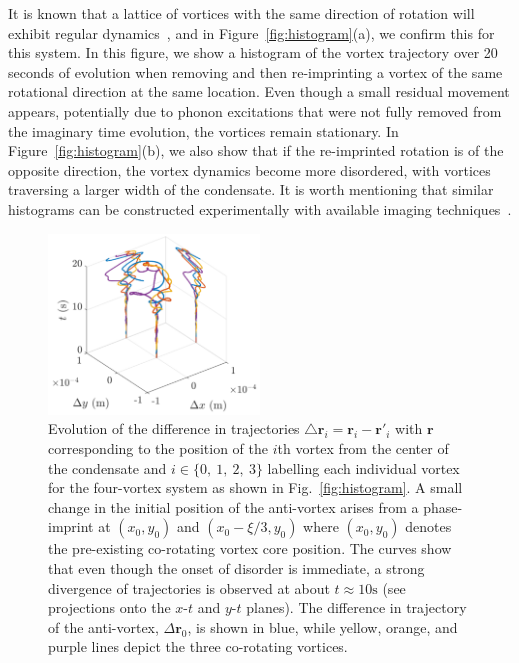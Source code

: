It is known that a lattice of vortices with the same direction of rotation will exhibit regular dynamics~\cite{abo2001}, and in Figure~\ref{fig:histogram}(a), we confirm this for this system.
In this figure, we show a histogram of the vortex trajectory over 20 seconds of evolution when removing and then re-imprinting a vortex of the same rotational direction at the same location.
Even though a small residual movement appears, potentially due to phonon excitations that were not fully removed from the imaginary time evolution, the vortices remain stationary.
In Figure~\ref{fig:histogram}(b), we also show that if the re-imprinted rotation is of the opposite direction, the vortex dynamics become more disordered, with vortices traversing a larger width of the condensate.
It is worth mentioning that similar histograms can be constructed experimentally with available imaging techniques~\cite{wilson2015,freilich2010}.

\begin{figure}
\center \includegraphics[width=0.5\textwidth]{data/2d/evolution/evolution}

\caption{
Evolution of the difference in trajectories $\triangle \textbf{r}_i = \textbf{r}_{i}-\textbf{r}'_{i}$ with $\textbf{r}$ corresponding to the position of the $i$th vortex from the center of the condensate and $i\in \{0,\ 1,\ 2,\ 3\}$ labelling each individual vortex for the four-vortex system as shown in Fig.~\ref{fig:histogram}.
A small change in the initial position of the anti-vortex arises from a phase-imprint at $(x_{0},y_{0})$ and $(x_{0}-\xi/3,y_{0})$ where $(x_{0},y_{0})$ denotes the pre-existing co-rotating vortex core position.
The curves show that even though the onset of disorder is immediate, a strong divergence of trajectories is observed at about $t\approx 10 \text{s}$ (see projections onto the $x$-$t$ and $y$-$t$ planes).
The difference in trajectory of the anti-vortex, $\Delta \mathbf{r}_0$, is shown in blue, while yellow, orange, and purple lines depict the three co-rotating vortices.
}
\label{fig:evolution}
\end{figure}

